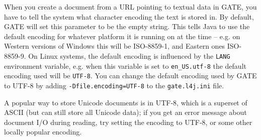 When you create a document from a URL pointing to textual data
in GATE, you have to tell the system what character encoding the text is
stored in. By default, GATE will set this parameter to be the empty string.
This tells Java to use the default encoding for whatever platform it is
running on at the time -- e.g. on Western versions of Windows this will be
ISO-8859-1, and Eastern ones ISO-8859-9. On Linux systems, the default 
encoding is influenced by the \texttt{LANG} environment variable, e.g.
when this variable is set to \texttt{en\_US.utf-8} the default encoding used
will be \texttt{UTF-8}. You can change the default encoding used by GATE to
UTF-8 by adding \texttt{-Dfile.encoding=UTF-8} to the \texttt{gate.l4j.ini}
file.

A popular way to store Unicode
documents is in UTF-8, which is a superset of ASCII (but can still store all
Unicode data); if you get
an error message about document I/O during reading, try setting the encoding
to UTF-8, or some other locally popular encoding.

